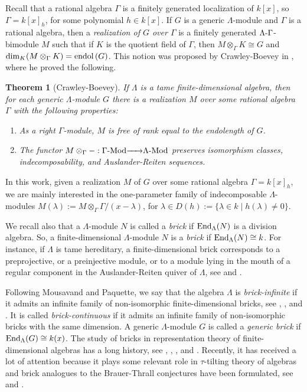 \documentclass{article}
\newtheorem{theorem}{Theorem}[section]
\theoremstyle{definition}
\newcommand{\End}{{ \rm End }}
\newcommand{\Mod}{{ \rm Mod }}
\newcommand{\g}{\hbox{-}}
\newcommand{\Endol}[1]{\hbox{\rm endol}\,(#1)}
\newcommand{\rightmap}[1]{\smash{\mathop{\hbox to 
20pt{\rightarrowfill}}\limits^{#1}}}
\begin{document}
Recall that a rational algebra $\Gamma$ is a 
finitely generated localization of $k[x]$, so $\Gamma=k[x]_h$, for some polynomial $h\in k[x]$. If $G$ is a generic $\Lambda$-module and $\Gamma$ is a rational algebra, then a \emph{realization of $G$ over $\Gamma$} is a finitely generated $\Lambda\g \Gamma$-bimodule $M$ such that if $K$ is the quotient field of $\Gamma$, then $M\otimes_\Gamma K\cong G$ and $\dim_K(M\otimes_\Gamma K)=\Endol{G}$.  This notion was proposed by 
Crawley-Boevey in \cite{CB2}, where he proved the following. 


\begin{theorem}[Crawley-Boevey]\label{T: CB-realizations} If $\Lambda$ is a  tame 
finite-dimensional algebra, then for each generic $\Lambda$-module $G$ there is  a realization $M$ over some rational algebra $\Gamma$  with the following properties: 
\begin{enumerate}
\item  As a right $\Gamma$-module, $M$ is 
free of rank equal to the endolength of $G$. 
\item The functor $M\otimes_\Gamma-:\Gamma\g\Mod\rightmap{}\Lambda\g\Mod$ 
 preserves isomorphism classes,  indecomposability, and Auslander-Reiten sequences. 
\end{enumerate} 
\end{theorem}
 
In this work, given a realization $M$ of $G$ over some rational algebra $\Gamma=k[x]_h$, we are mainly interested in the one-parameter family of indecomposable $\Lambda$-modules $M(\lambda):=M\otimes_\Gamma\Gamma/(x-\lambda)$, for $\lambda\in D(h):=\{\lambda\in k\mid h(\lambda)\not=0\}$.   


We recall also that a $\Lambda$-module $N$ is called a \emph{brick} if $\End_\Lambda(N)$ is a division algebra. So, a finite-dimensional $\Lambda$-module $N$  is a \emph{brick}  if $\End_{\Lambda}(N) \cong  k$. For instance, if $\Lambda$ is tame hereditary, a finite-dimensional brick corresponds to a preprojective, or a  preinjective module, or to a module lying in the mouth of a regular component in the Auslander-Reiten quiver of $\Lambda$, see \cite{ars} and \cite{Ri}. 

Following Mousavand and Paquette, we say that  the algebra $\Lambda$ is \emph{brick-infinite} if it admits an infinite family of non-isomorphic finite-dimensional bricks, see \cite{MP2}, \cite{DIJ}, and \cite{Sentieri}. It is called \emph{brick-continuous} if it admits an infinite family of non-isomorphic bricks with the same dimension. A generic $\Lambda$-module $G$ is called a \emph{generic brick} if $\End_{\Lambda}(G)\cong k(x)$. The study of bricks in representation theory of finite-dimensional algebras has a long history, see \cite{Ri-spec}, \cite{B-D}, \cite{MP2}, and \cite{MP3}.   Recently, it has received  a lot of attention because it plays  some relevant role in $\tau$-tilting theory of algebras and  brick analogues to the Brauer-Thrall conjectures have been formulated, see \cite{MP1} and \cite{MP3}. 
\end{document}
